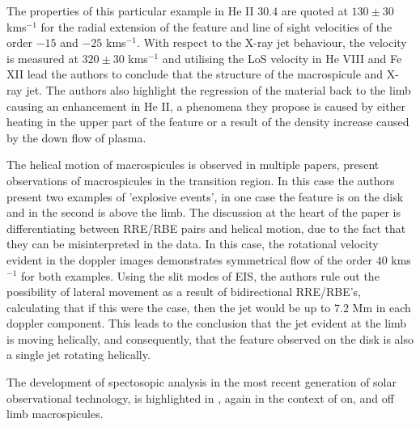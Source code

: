 The properties of this particular example in He II $30.4$ are quoted at $130 \pm 30$ kms${^{-1}}$ for the radial extension of the feature and line of sight velocities of the order $-15$ and $-25$ kms${^{-1}}$.
With respect to the X-ray jet behaviour, the velocity is measured at $320 \pm 30$ kms${^{-1}}$ and utilising the LoS velocity in He VIII and Fe XII lead the authors to conclude that the structure of the macrospicule and X-ray jet. 
The authors also highlight the regression of the material back to the limb causing an enhancement in He II, a phenomena they propose is caused by either heating in the upper part of the feature or a result of the density increase caused by the down flow of plasma.

The helical motion of macrospicules is observed in multiple papers, \cite{Curdt2011} present observations of macrospicules in the transition region.
In this case the authors present two examples of 'explosive events', in one case the feature is on the disk and in the second is above the limb.
The discussion at the heart of the paper is differentiating between RRE/RBE pairs and helical motion, due to the fact that they can be misinterpreted in the data. 
In this case, the rotational velocity evident in the doppler images demonstrates symmetrical flow of the order $40$ kms${^{-1}}$ for both examples.
Using the slit modes of EIS, the authors rule out the possibility of lateral movement as a result of bidirectional RRE/RBE's, calculating that if this were the case, then the jet would be up to $7.2$ Mm in each doppler component.
This leads to the conclusion that the jet evident at the limb is moving helically, and consequently, that the feature observed on the disk is also a single jet rotating helically.

The development of spectosopic analysis in the most recent generation of solar observational technology, is highlighted in \cite{Scullion2010}, again in the context of on, and off limb macrospicules. 
























 
































